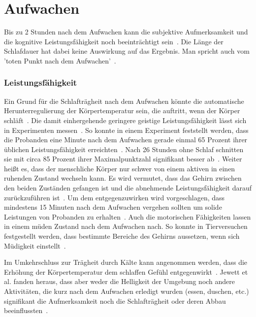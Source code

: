 \section{Aufwachen}\label{sec:relatedWork.aufwachen}

Bis zu 2 Stunden nach dem Aufwachen kann die subjektive Aufmerksamkeit und die kognitive Leistungsfähigkeit noch beeinträchtigt sein~\cite{jewett1999time, online:muedesGehirn}. 
Die Länge der Schlafdauer hat dabei keine Auswirkung auf das Ergebnis. Man spricht auch vom 'toten Punkt nach dem Aufwachen'~\cite{online:muedesGehirn}. 

\subsubsection{Leistungsfähigkeit}

Ein Grund für die Schlafträgheit nach dem Aufwachen könnte die automatische Herunterregulierung der Körpertemperatur sein, die auftritt, wenn der Körper schläft~\cite{dinges1990you}. Die damit einhergehende geringere geistige Leistungsfähigkeit lässt sich in Experimenten messen~\cite{dinges1990you,wilkinson1971performance, online:muedesGehirn, online:muede, online:uebermuedetesHirn}. 
So konnte in einem Experiment feststellt werden, dass die Probanden eine Minute nach dem Aufwachen gerade einmal 65 Prozent ihrer üblichen Leistungsfähigkeit erreichten~\cite{online:muedesGehirn}. Nach 26 Stunden ohne Schlaf schnitten sie mit circa 85 Prozent ihrer Maximalpunktzahl signifikant besser ab~\cite{online:muedesGehirn}. 
Weiter heißt es, dass der menschliche Körper nur schwer von einem aktiven in einen ruhenden Zustand wechseln kann. Es wird vermutet, dass das Gehirn zwischen den beiden Zuständen gefangen ist und die abnehmende Leistungsfähigkeit darauf zurückzuführen ist~\cite{online:muede}.
Um dem entgegenzuwirken wird vorgeschlagen, dass mindestens 15 Minuten nach dem Aufwachen vergehen sollten um solide Leistungen von Probanden zu erhalten~\cite{wilkinson1971performance}.
Auch die motorischen Fähigkeiten lassen in einem müden Zustand nach dem Aufwachen nach. So konnte in Tierversuchen festgestellt werden, dass bestimmte Bereiche des Gehirns aussetzen, wenn sich Müdigkeit einstellt~\cite{online:uebermuedetesHirn}.

Im Umkehrschluss zur Trägheit durch Kälte kann angenommen werden, dass die Erhöhung der Körpertemperatur dem schlaffen Gefühl entgegenwirkt~\cite{jewett1999time}.
Jewett et al. fanden heraus, dass aber weder die Helligkeit der Umgebung noch andere Aktivitäten, die kurz nach dem Aufwachen erledigt wurden (essen, duschen, etc.) signifikant die Aufmerksamkeit noch die Schlafträgheit oder deren Abbau beeinflussten~\cite{jewett1999time}.

